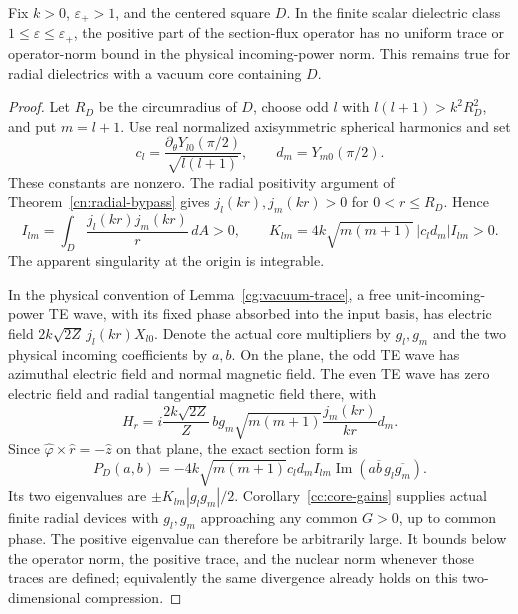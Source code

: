 \begin{proposition}
\label{cp:trace}
Fix $k>0$, $\varepsilon_+>1$, and the centered square $D$. In the
finite scalar dielectric class $1\leq\varepsilon\leq\varepsilon_+$,
the positive part of the section-flux operator has no uniform trace or
operator-norm bound in the physical incoming-power norm. This remains
true for radial dielectrics with a vacuum core containing $D$.
\end{proposition}
\begin{proof}
Let $R_D$ be the circumradius of $D$, choose odd $l$ with
$l(l+1)>k^2R_D^2$, and put $m=l+1$. Use real normalized axisymmetric
spherical harmonics and set
\[
 c_l=\frac{\partial_\theta Y_{l0}(\pi/2)}{\sqrt{l(l+1)}},
 \qquad d_m=Y_{m0}(\pi/2).
\]
These constants are nonzero. The radial positivity argument of
Theorem~\ref{cn:radial-bypass} gives $j_l(kr),j_m(kr)>0$ for
$0<r\leq R_D$. Hence
\begin{equation}\label{cp:positiveconstant}
 I_{lm}=\int_D\frac{j_l(kr)j_m(kr)}r\,dA>0,
 \qquad K_{lm}=4k\sqrt{m(m+1)}\,|c_ld_m|I_{lm}>0.
\end{equation}
The apparent singularity at the origin is integrable.

In the physical convention of Lemma~\ref{cg:vacuum-trace}, a free
unit-incoming-power TE wave, with its fixed phase absorbed into the
input basis, has electric field
$2k\sqrt{2Z}\,j_l(kr)X_{l0}$. Denote the actual core multipliers
by $g_l,g_m$ and the two physical incoming coefficients by $a,b$.
On the plane, the odd TE wave has azimuthal electric field and normal
magnetic field. The even TE wave has zero electric field and radial
tangential magnetic field there, with
\[
 H_r=i\frac{2k\sqrt{2Z}}Z\,b g_m\sqrt{m(m+1)}
             \frac{j_m(kr)}{kr}d_m.
\]
Since $\widehat\varphi\times\widehat r=-\widehat z$ on that plane,
the exact section form is
\begin{equation}\label{cp:two-mode-form}
 P_D(a,b)=-4k\sqrt{m(m+1)}c_ld_m I_{lm}
             \operatorname{Im}(a\overline b\,g_l\overline{g_m}).
\end{equation}
Its two eigenvalues are $\pm K_{lm}|g_lg_m|/2$.
Corollary~\ref{cc:core-gains} supplies actual finite radial devices
with $g_l,g_m$ approaching any common $G>0$, up to common phase.
The positive eigenvalue can therefore be arbitrarily large.
It bounds below the operator norm, the positive trace, and the
nuclear norm whenever those traces are defined; equivalently the
same divergence already holds on this two-dimensional compression.
\end{proof}

